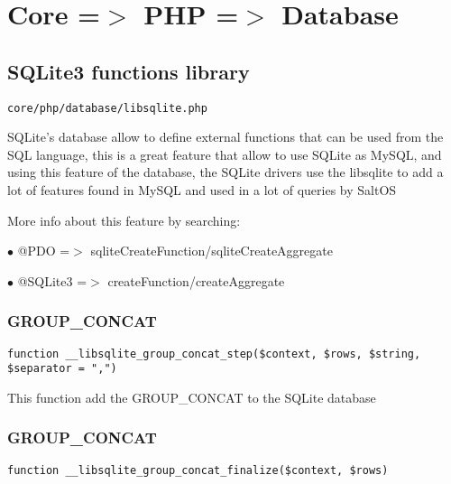 \documentclass[a4paper]{book}
\begin{document}
\hypertarget{toc290}{}
\chapter{Core =$>$ PHP =$>$ Database}

\hypertarget{toc291}{}
\section{SQLite3 functions library}

\begin{lstlisting}
core/php/database/libsqlite.php
\end{lstlisting}

SQLite's database allow to define external functions that can be used from the SQL language,
this is a great feature that allow to use SQLite as MySQL, and using this feature of the
database, the SQLite drivers use the libsqlite to add a lot of features found in MySQL and
used in a lot of queries by SaltOS

More info about this feature by searching:

\begin{compactitem}
\item[\color{myblue}$\bullet$] @PDO     =$>$ sqliteCreateFunction/sqliteCreateAggregate
\item[\color{myblue}$\bullet$] @SQLite3 =$>$ createFunction/createAggregate
\end{compactitem}

\hypertarget{toc292}{}
\subsection{GROUP\_CONCAT}

\begin{lstlisting}
function __libsqlite_group_concat_step($context, $rows, $string, $separator = ",")
\end{lstlisting}

This function add the GROUP\_CONCAT to the SQLite database

\hypertarget{toc293}{}
\subsection{GROUP\_CONCAT}

\begin{lstlisting}
function __libsqlite_group_concat_finalize($context, $rows)
\end{lstlisting}
\end{document}
